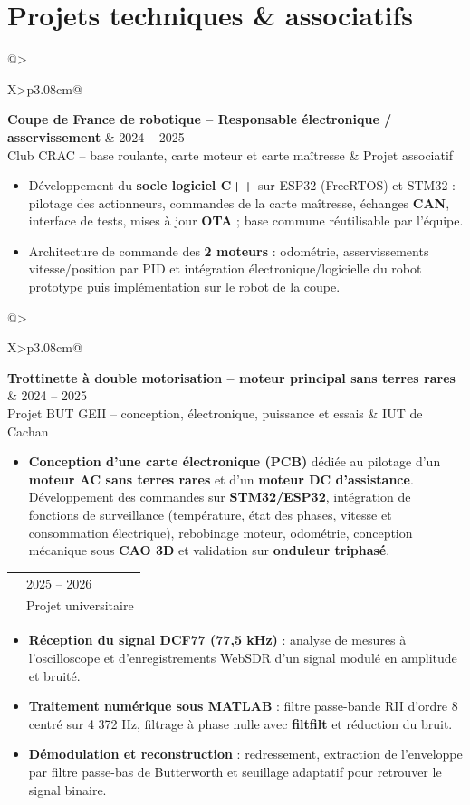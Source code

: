 \documentclass[9pt,a4paper]{extarticle}
\makeatletter
\newcommand{\entry}[4]{%
\begin{tabularx}{\linewidth}{@{}>{\raggedright\arraybackslash}X>{\raggedleft\arraybackslash}p{3.08cm}@{}}
 {\bfseries\color{bleu}#1} & {\fontsize{8.5}{9.3}\selectfont\color{secondaire}#2} \\[-2pt]
 {\fontsize{8.5}{9.6}\selectfont\color{secondaire}#3} & {\fontsize{8.5}{9.3}\selectfont\color{secondaire}#4}
\end{tabularx}\vspace{-3.4pt}\par}
\newcommand{\gapentry}{\vspace{3.1pt}}
\makeatother
\begin{document}
{\section{Projets techniques \& associatifs}
\entry{Coupe de France de robotique -- Responsable électronique / asservissement}{2024 -- 2025}{Club CRAC -- base roulante, carte moteur et carte maîtresse}{Projet associatif}
\begin{itemize}
  \item Développement du \textbf{socle logiciel C++} sur ESP32 (FreeRTOS) et STM32 : pilotage des actionneurs, commandes de la carte maîtresse, échanges \textbf{CAN}, interface de tests, mises à jour \textbf{OTA} ; base commune réutilisable par l'équipe.
  \item Architecture de commande des \textbf{2 moteurs} : odométrie, asservissements vitesse/position par PID et intégration électronique/logicielle du robot prototype puis implémentation sur le robot de la coupe.
\end{itemize}
\gapentry
\entry{Trottinette à double motorisation -- moteur principal sans terres rares}{2024 -- 2025}{Projet BUT GEII -- conception, électronique, puissance et essais}{IUT de Cachan}
\begin{itemize}
\item \textbf{Conception d'une carte électronique (PCB)} dédiée au pilotage d'un \textbf{moteur AC sans terres rares} et d'un \textbf{moteur DC d'assistance}. Développement des commandes sur \textbf{STM32/ESP32}, intégration de fonctions de surveillance (température, état des phases, vitesse et consommation électrique), rebobinage moteur, odométrie, conception mécanique sous \textbf{CAO 3D} et validation sur \textbf{onduleur triphasé}.\end{itemize}
\gapentry
\entry{Projet Polytech Sorbonne -- Traitement numérique du signal}{2025 -- 2026}{Réception et démodulation du signal radio DCF77}{Projet universitaire}
\begin{itemize}
    \item \textbf{Réception du signal DCF77 (77,5 kHz)} : analyse de mesures à l'oscilloscope et d'enregistrements WebSDR d'un signal modulé en amplitude et bruité.

    \item \textbf{Traitement numérique sous MATLAB} : filtre passe-bande RII d'ordre 8 centré sur 4 372 Hz, filtrage à phase nulle avec \textbf{filtfilt} et réduction du bruit.

    \item \textbf{Démodulation et reconstruction} : redressement, extraction de l'enveloppe par filtre passe-bas de Butterworth et seuillage adaptatif pour retrouver le signal binaire.


\end{itemize}}
\end{document}
